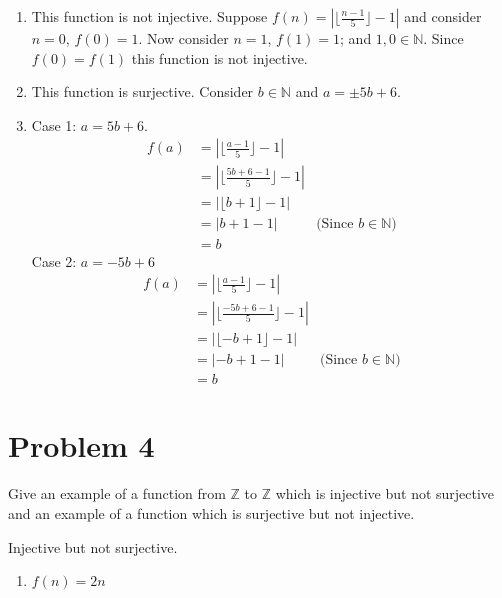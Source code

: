 \documentclass{article}
\begin{document}
    \begin{enumerate}[label=\quad\quad, leftmargin=*]
        \item 
        This function is not injective. Suppose $f(n)=|\lfloor\frac{n-1}{5}\rfloor-1|$ 
        and consider $n=0$, $f(0) = 1$. Now consider $n=1$, $f(1)=1$; and $1,0\in\mathbb{N}$. Since $f(0)=f(1)$
        this function is not injective.
        \item
        This function is surjective. Consider $b\in\mathbb{N}$ and $a=\pm 5b+6$.
        \item
        Case 1: $a=5b+6$.
        \begin{align*}
            f(a)&=|\lfloor\frac{a-1}{5}\rfloor-1| \\
            &=|\lfloor\frac{5b+6-1}{5}\rfloor-1| \\
            &=|\lfloor b+1\rfloor-1| \\
            &=|b+1-1| & \text{(Since $b\in\mathbb{N})$}\\
            &=b 
        \end{align*}
        Case 2: $a= -5b+6$
        \begin{align*}
            f(a)&=|\lfloor\frac{a-1}{5}\rfloor-1| \\
            &=|\lfloor\frac{-5b+6-1}{5}\rfloor-1| \\
            &=|\lfloor -b+1\rfloor-1| \\
            &=|-b+1-1| & \text{(Since $b\in\mathbb{N})$}\\
            &=b 
        \end{align*}
    \end{enumerate}



    \section*{Problem 4}

    Give an example of a function from $\mathbb{Z}$ to $\mathbb{Z}$ which is injective 
    but not surjective and an example of a function which is surjective but not injective.

    Injective but not surjective.

    \begin{enumerate}[label=\quad\quad, leftmargin=*]
        \item $f(n) = 2n$
    \end{enumerate}
\end{document}
